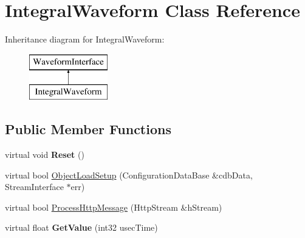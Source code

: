\hypertarget{classIntegralWaveform}{
\section{IntegralWaveform Class Reference}
\label{classIntegralWaveform}
}
Inheritance diagram for IntegralWaveform:\begin{figure}[H]
\begin{center}
\leavevmode
\includegraphics[height=2.000000cm]{classIntegralWaveform}
\end{center}
\end{figure}
\subsection*{Public Member Functions}
\begin{DoxyCompactItemize}
\item 
\hypertarget{classIntegralWaveform_a4586b9513a71ac52a5412402a6f39ba7}{
virtual void {\bfseries Reset} ()}
\label{classIntegralWaveform_a4586b9513a71ac52a5412402a6f39ba7}

\item 
virtual bool \hyperlink{classIntegralWaveform_a5c22fc22e29ab3589821de1bdabfe45a}{ObjectLoadSetup} (ConfigurationDataBase \&cdbData, StreamInterface $\ast$err)
\item 
virtual bool \hyperlink{classIntegralWaveform_a7b2d5fe30d954a19ac551bb9afff0124}{ProcessHttpMessage} (HttpStream \&hStream)
\item 
\hypertarget{classIntegralWaveform_a9a35249283d5fa2d0979d74315035fc9}{
virtual float {\bfseries GetValue} (int32 usecTime)}
\label{classIntegralWaveform_a9a35249283d5fa2d0979d74315035fc9}

\end{DoxyCompactItemize}


